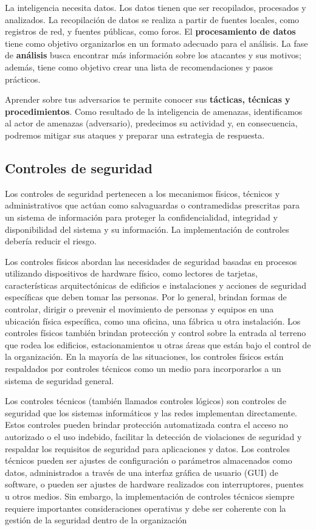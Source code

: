 La inteligencia necesita datos. Los datos tienen que ser recopilados, procesados y analizados. La recopilación de datos se realiza a partir de fuentes locales, como registros de red, y fuentes públicas, como foros. El \textbf{procesamiento de datos } tiene como objetivo organizarlos en un formato adecuado para el análisis. La fase de \textbf{análisis} busca encontrar más información sobre los atacantes y sus motivos; además, tiene como objetivo crear una lista de recomendaciones y pasos prácticos.

Aprender sobre tus adversarios te permite conocer sus \textbf{tácticas, técnicas y procedimientos}. Como resultado de la inteligencia de amenazas, identificamos al actor de amenazas (adversario), predecimos su actividad y, en consecuencia, podremos mitigar sus ataques y preparar una estrategia de respuesta.


\subsection{Controles de seguridad}
Los controles de seguridad pertenecen a los mecanismos físicos, técnicos y administrativos que actúan como salvaguardas o contramedidas prescritas para un sistema de información para proteger la confidencialidad, integridad y disponibilidad del sistema y su información. La implementación de controles debería reducir el riesgo.

Los controles físicos abordan las necesidades de seguridad basadas en procesos utilizando dispositivos de hardware físico, como lectores de tarjetas, características arquitectónicas de edificios e instalaciones y acciones de seguridad específicas que deben tomar las personas. Por lo general, brindan formas de controlar, dirigir o prevenir el movimiento de personas y equipos en una ubicación física específica, como una oficina, una fábrica u otra instalación. Los controles físicos también brindan protección y control sobre la entrada al terreno que rodea los edificios, estacionamientos u otras áreas que están bajo el control de la organización. En la mayoría de las situaciones, los controles físicos están respaldados por controles técnicos como un medio para incorporarlos a un sistema de seguridad general.

Los controles técnicos (también llamados controles lógicos) son controles de seguridad que los sistemas informáticos y las redes implementan directamente. Estos controles pueden brindar protección automatizada contra el acceso no autorizado o el uso indebido, facilitar la detección de violaciones de seguridad y respaldar los requisitos de seguridad para aplicaciones y datos. Los controles técnicos pueden ser ajustes de configuración o parámetros almacenados como datos, administrados a través de una interfaz gráfica de usuario (GUI) de software, o pueden ser ajustes de hardware realizados con interruptores, puentes u otros medios. Sin embargo, la implementación de controles técnicos siempre requiere importantes consideraciones operativas y debe ser coherente con la gestión de la seguridad dentro de la organización

